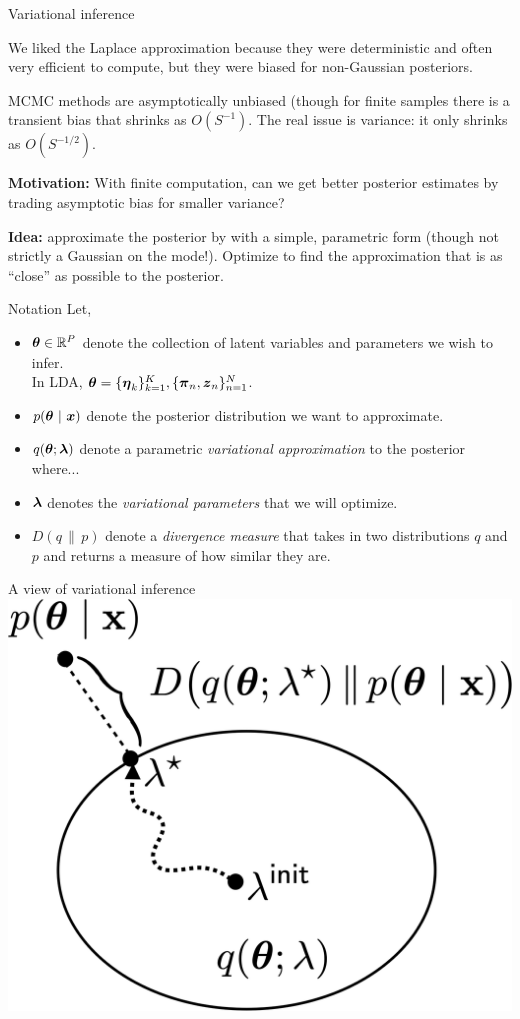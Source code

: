 \documentclass[aspectratio=169]{beamer}
\begin{document}
\begin{frame}{Variational inference}

We liked the Laplace approximation because they were deterministic and often very efficient to compute, but they were biased for non-Gaussian posteriors.

MCMC methods are asymptotically unbiased (though for finite samples there is a transient bias that shrinks as $O(S^{-1})$. The real issue is variance: it only shrinks as $O(S^{-1/2})$.

\textbf{Motivation: } With finite computation, can we get better posterior estimates by trading asymptotic bias for smaller variance? 

\textbf{Idea: } approximate the posterior by with a simple, parametric form (though not strictly a Gaussian on the mode!). Optimize to find the approximation that is as ``close'' as possible to the posterior.
    
\end{frame}

\begin{frame}{Notation}
Let,
\begin{itemize}
    \item $\boldsymbol{\theta} \in \mathbb{R}^P$ denote the collection of latent variables and parameters we wish to infer. \\
    In LDA, $\boldsymbol{\theta} = \{\boldsymbol{\eta}_k\}_{k=1}^K, \{\boldsymbol{\pi}_n, \boldsymbol{z}_n\}_{n=1}^N$.
    
    \item $p(\boldsymbol{\theta} ~\vert~ \boldsymbol{x})$ denote the posterior distribution we want to approximate.
    
    \item $q(\boldsymbol{\theta}; \boldsymbol{\lambda})$ denote a parametric \textit{variational approximation} to the posterior where...
    
    \item $\boldsymbol{\lambda}$ denotes the \textit{variational parameters} that we will optimize.
    
    \item $D(q \, \| \, p)$ denote a \textit{divergence measure} that takes in two distributions $q$ and $p$ and returns a measure of how similar they are.
\end{itemize}
\end{frame}

\begin{frame}{A view of variational inference}
\centering
    \includegraphics[width=.5\textwidth]{figures/lap5/vi.png}
\end{frame}
\end{document}
